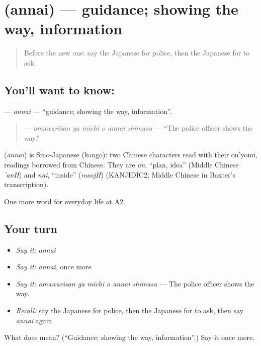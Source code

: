\section[\texorpdfstring{\ja{あんない} (annai)}{あんない (annai)}]{ (annai) — guidance; showing the way, information}

\label{lesson:JA-C192-annai}



\begin{quote}
Before the new one: say the Japanese for police, then the Japanese for to ask.
\end{quote}

\subsection*{You'll want to know: }
\textbf{} — \emph{annai} — \textquotedblleft{}guidance; showing the way, information\textquotedblright{}.

\begin{quote}
\textbf{  } — \emph{omawarisan ga michi o annai shimasu} — \textquotedblleft{}The police officer shows the way.\textquotedblright{}
\end{quote}

\begin{cousinweb}
\textbf{} (\emph{annai}) is Sino-Japanese (kango): two Chinese characters read with their on'yomi, readings borrowed from Chinese. They are \emph{an}, \textquotedblleft{}plan, idea\textquotedblright{} (Middle Chinese \emph{'anH}) and \emph{nai}, \textquotedblleft{}inside\textquotedblright{} (\emph{nwojH}) (KANJIDIC2; Middle Chinese in Baxter's transcription).
\end{cousinweb}

\begin{grammarlens}[title={What you've built}]
One more word for everyday life at A2.
\end{grammarlens}

\subsection*{Your turn}
\begin{itemize}
\raggedright
  \item \emph{Say it:} \emph{annai}
  \item \emph{Say it:} \emph{annai}, once more
  \item \emph{Say it:} \emph{omawarisan ga michi o annai shimasu} — The police officer shows the way.
  \item \emph{Recall:} say the Japanese for police, then the Japanese for to ask, then say \emph{annai} again
\end{itemize}

\begin{tcolorbox}[breakable,colback=teal!4,colframe=teal!35!black,title={Before you move on}]
What does  mean? (\textquotedblleft{}Guidance; showing the way, information\textquotedblright{}.) Say it once more.
\end{tcolorbox}

